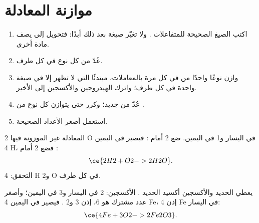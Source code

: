\section{موازنة المعادلة}

\begin{method}\label{met:g8:balanced-equations:balance}
\begin{enumerate}
  \item اكتب الصيغ الصحيحة للمتفاعلات . ولا تغيّر صيغة بعد ذلك
        أبدًا: فتحويل  إلى  يصف مادة
        أخرى.
  \item عُدّ  من كل نوع في كل طرف.
  \item وازن نوعًا واحدًا من  في كل مرة بالمعاملات، مبتدئًا 
        التي لا تظهر إلا في صيغة واحدة في كل طرف؛ واترك الهيدروجين
        والأكسجين إلى الأخير.
  \item عُدّ من جديد؛ وكرر حتى يتوازن كل نوع من .
  \item استعمل أصغر الأعداد الصحيحة.
\end{enumerate}
\end{method}

\begin{example}\label{ex:g8:balanced-equations:water}
المعادلة غير الموزونة  %
فيها 2 O في اليسار و1 في اليمين. ضع 2 أمام : فيصير في اليمين
4 H، فضع 2 أمام :
\[
  \ce{2H2 + O2 -> 2H2O}.
\]
التحقق: 4 H و2 O في كل طرف.
\end{example}

\begin{example}\label{ex:g8:balanced-equations:iron-oxide}
يعطي الحديد والأكسجين أكسيد الحديد . الأكسجين: 2 في اليسار
و3 في اليمين؛ وأصغر عدد مشترك هو 6، إذن 3  و2
. فيصير في اليمين 4 Fe، إذن 4 Fe في اليسار:
\[
  \ce{4Fe + 3O2 -> 2Fe2O3}.
\]
\end{example}

